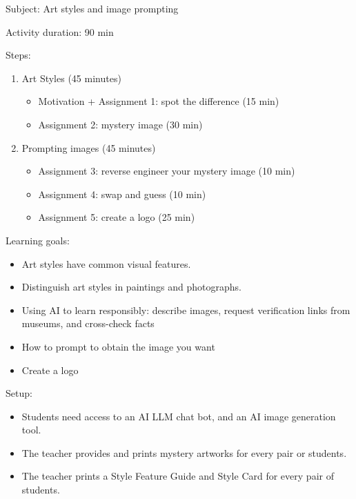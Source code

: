 \documentclass[12pt]{article}
\begin{document}
\vspace*{5 cm}
Subject: Art styles and image prompting

Activity duration: 90 min

\vspace{0.5cm}

Steps:
\begin{enumerate}
    \item Art Styles (45 minutes)
    \begin{itemize}
  \item Motivation + Assignment 1: spot the difference (15 min)
  \item Assignment 2: mystery image (30 min)
\end{itemize}
    \item Prompting images (45 minutes)
\begin{itemize}
  \item Assignment 3: reverse engineer your mystery image (10 min)
  \item Assignment 4: swap and guess (10 min)
  \item Assignment 5: create a logo (25 min)
\end{itemize}
\end{enumerate}
Learning goals:

\begin{itemize}
  \item Art styles have common visual features. 
  \item Distinguish art styles in paintings and photographs.
  \item Using AI to learn responsibly: describe images, request verification links from museums, and cross-check facts
  \item How to prompt to obtain the image you want
  \item Create a logo
\end{itemize}

Setup: 
\begin{itemize}
  \item Students need access to an AI LLM chat bot, and an AI image generation tool. 
  \item The teacher provides and prints mystery artworks for every pair or students.
  \item The teacher prints a Style Feature Guide and Style Card for every pair of students. 
\end{itemize}
\end{document}
